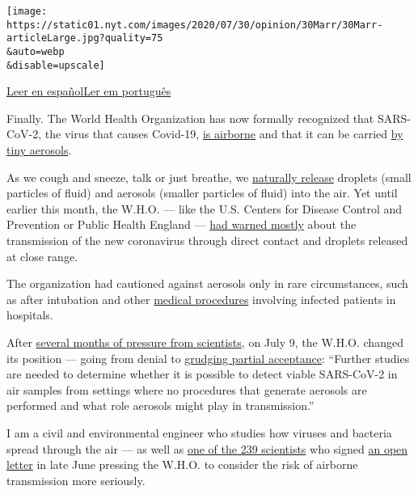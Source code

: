 \texttt{[image: https://static01.nyt.com/images/2020/07/30/opinion/30Marr/30Marr-articleLarge.jpg?quality=75\\\&auto=webp\\\&disable=upscale]}

\href{https://www.nytimes.com/es/2020/08/01/espanol/opinion/coronavirus-aire.html}{Leer
en
español}\href{https://www.nytimes.com/pt/2020/08/05/opinion/international-world/coronavirus-esta-no-ar.html}{Ler
em português}

Finally. The World Health Organization has now formally recognized that
SARS-CoV-2, the virus that causes Covid-19,
\href{https://www.nytimes.com/2020/07/09/health/virus-aerosols-who.html}{is
airborne} and that it can be carried
\href{https://www.nature.com/articles/d41586-020-02058-1}{by tiny
aerosols}.

As we cough and sneeze, talk or just breathe, we
\href{https://www.sciencedirect.com/science/article/pii/S0021850211001200}{naturally
release} droplets (small particles of fluid) and aerosols (smaller
particles of fluid) into the air. Yet until earlier this month, the
W.H.O. --- like the U.S. Centers for Disease Control and Prevention or
Public Health England ---
\href{https://www.who.int/news-room/commentaries/detail/modes-of-transmission-of-virus-causing-covid-19-implications-for-ipc-precaution-recommendations}{had
warned mostly} about the transmission of the new coronavirus through
direct contact and droplets released at close range.

The organization had cautioned against aerosols only in rare
circumstances, such as after intubation and other
\href{https://www.who.int/publications/i/item/WHO-2019-nCoV-IPC-2020.4}{medical
procedures} involving infected patients in hospitals.

After
\href{https://www.nature.com/articles/d41586-020-00974-w\#ref-CR5}{several
months of pressure from scientists}, on July 9, the W.H.O. changed its
position --- going from denial to
\href{https://www.who.int/news-room/commentaries/detail/transmission-of-sars-cov-2-implications-for-infection-prevention-precautions}{grudging
partial acceptance}: ``Further studies are needed to determine whether
it is possible to detect viable SARS-CoV-2 in air samples from settings
where no procedures that generate aerosols are performed and what role
aerosols might play in transmission.''

I am a civil and environmental engineer who studies how viruses and
bacteria spread through the air --- as well as
\href{https://www.nytimes.com/2020/07/04/health/239-experts-with-one-big-claim-the-coronavirus-is-airborne.html}{one
of the 239 scientists} who signed
\href{https://academic.oup.com/cid/article/doi/10.1093/cid/ciaa939/5867798}{an
open letter} in late June pressing the W.H.O. to consider the risk of
airborne transmission more seriously.

